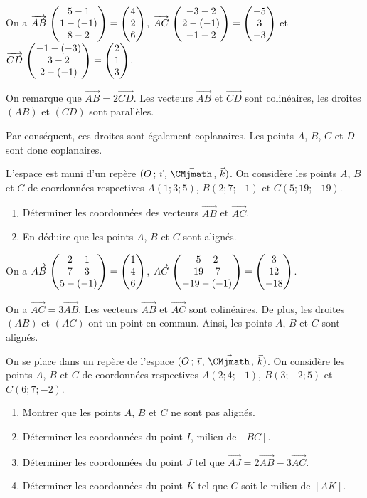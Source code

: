 \documentclass[11pt,fleqn, openany]{book} %
\begin{document}
\begin{solution}
On a $\coorde{AB}{5-1}{1-(-1)}{8-2}=\coordbe{4}{2}{6}$, $\coorde{AC}{-3-2}{2-(-1)}{-1-2}=\coordbe{-5}{3}{-3}$ et $\coorde{CD}{-1-(-3)}{3-2}{2-(-1)}=\coordbe{2}{1}{3}$.

On remarque que $\overrightarrow{AB}=2\overrightarrow{CD}$. Les vecteurs $\overrightarrow{AB}$ et $\overrightarrow{CD}$ sont colinéaires, les droites $(AB)$ et $(CD)$ sont parallèles.

Par conséquent, ces droites sont également coplanaires. Les points $A$, $B$, $C$ et $D$ sont donc coplanaires.\end{solution}




\begin{exercise}L'espace est muni d'un repère $\Oijk$. On considère les points $A$, $B$ et $C$ de coordonnées respectives $A(1;3;5)$, $B(2;7;-1)$ et $C(5;19;-19)$.
\begin{enumerate}
\item Déterminer les coordonnées des vecteurs $\overrightarrow{AB}$ et $\overrightarrow{AC}$.
\item En déduire que les points $A$, $B$ et $C$ sont alignés.
\end{enumerate}\end{exercise}


\begin{solution}On a $\coorde{AB}{2-1}{7-3}{5-(-1)}=\coordbe{1}{4}{6}$, $\coorde{AC}{5-2}{19-7}{-19-(-1)}=\coordbe{3}{12}{-18}$.

On a $\overrightarrow{AC}=3\overrightarrow{AB}$. Les vecteurs $\overrightarrow{AB}$ et $\overrightarrow{AC}$ sont colinéaires. De plus, les droites $(AB)$ et $(AC)$ ont un point en commun. Ainsi, les points $A$, $B$ et $C$ sont alignés.\end{solution}



\begin{exercise}On se place dans un repère de l'espace $\Oijk$. On considère les points $A$, $B$ et $C$ de coordonnées respectives $A(2;4;-1)$, $B(3;-2;5)$ et $C(6;7;-2)$.
\begin{enumerate}
\item Montrer que les points $A$, $B$ et $C$ ne sont pas alignés.
\item Déterminer les coordonnées du point $I$, milieu de $[BC]$.
\item Déterminer les coordonnées du point $J$ tel que $\overrightarrow{AJ}=2\overrightarrow{AB}-3\overrightarrow{AC}$.
\item Déterminer les coordonnées du point $K$ tel que $C$ soit le milieu de $[AK]$.
\end{enumerate}\end{exercise}
\end{document}
